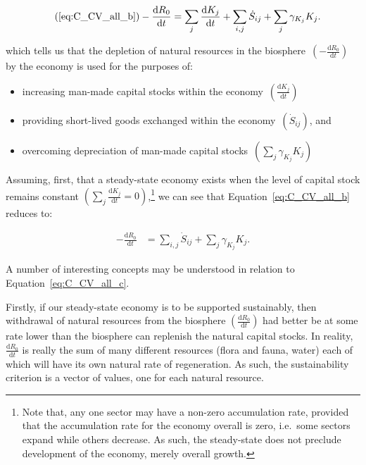 \begin{align}\tag{\ref{eq:C_CV_all_b}}
	- \frac{\mathrm{d}R_{0}}{\mathrm{d}t}										&
	=\sum_{j}\frac{\mathrm{d}K_{j}}{\mathrm{d}t}
	+ \sum_{i,j}\dot{S}_{ij}
	+ \sum_{j}\gamma_{K_{j}}K_{j}.
\end{align}

\noindent{}which tells us that 
the depletion of natural resources in the 
biosphere~$\left(- \frac{\mathrm{d}R_{0}}{\mathrm{d}t}\right)$
by the economy
is used for the purposes of:

\begin{itemize}
	\item increasing man-made capital stocks
	within the economy~$\left(\frac{\mathrm{d}K_{j}}{\mathrm{d}t}\right)$
	\item providing short-lived goods exchanged within the
	economy~$\left(\dot{S}_{ij}\right)$, and
	\item overcoming depreciation of man-made
	capital stocks~$\left(\sum\limits_{j}\gamma_{K_{j}}K_{j}\right)$ 
\end{itemize}

Assuming,
first,
that a steady-state economy exists when the level
of capital stock remains constant
$\left(\sum_{j}\frac{\mathrm{d}K_{j}}{\mathrm{d}t}=0\right)$,\footnote{Note
that,
any one sector may have a non-zero accumulation rate,
provided that the  accumulation rate for the economy overall is zero,
i.e.\ some sectors expand while others decrease.
As such,
the steady-state does not preclude development of the economy,
merely overall growth.}
we can see that Equation~\ref{eq:C_CV_all_b}
reduces to:

\begin{align}\label{eq:C_CV_all_c}
	- \frac{\mathrm{d}R_{0}}{\mathrm{d}t}										&
	= \sum_{i,j}\dot{S}_{ij}
	+ \sum_{j}\gamma_{K_{j}}K_{j}.
\end{align}

A number of interesting concepts may be understood in
relation to Equation~\ref{eq:C_CV_all_c}. 

Firstly,
if our steady-state economy is to be supported
sustainably,
then withdrawal of natural resources from the biosphere
$\left(\frac{\mathrm{d}R_{0}}{\mathrm{d}t}\right)$
had better be at some rate lower than the biosphere
can replenish the natural capital stocks. 
In reality, 
$\frac{\mathrm{d}R_{0}}{\mathrm{d}t}$
is really the sum of many different resources
(flora and fauna, water) each of which will have
its own natural rate of regeneration.
As such, 
the sustainability criterion  is a vector of values,
one for each natural resource.

